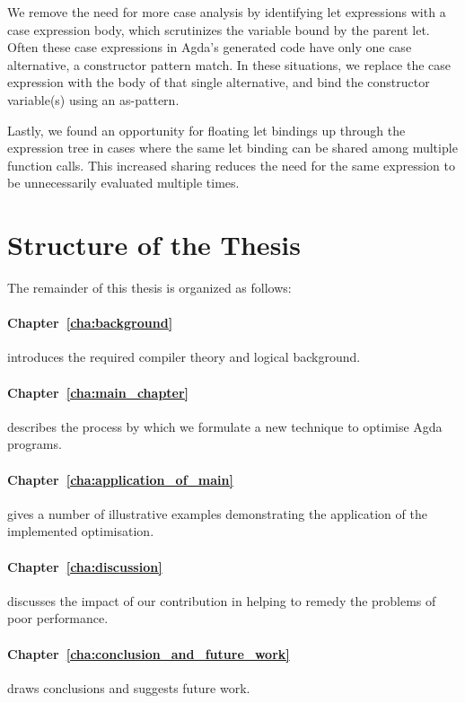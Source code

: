 We remove the need for more case analysis by identifying let expressions with a case expression body, which scrutinizes the variable bound by the parent let. Often these case expressions in Agda's generated code have only one case alternative, a constructor pattern match. In these situations, we replace the case expression with the body of that single alternative, and bind the constructor variable(s) using an as-pattern.

Lastly, we found an opportunity for floating let bindings up through the expression tree in cases where the same let binding can be shared among multiple function calls. This increased sharing reduces the need for the same expression to be unnecessarily evaluated multiple times.

\section{Structure of the Thesis}
\label{sec:structure_of_the_thesis}

The remainder of this thesis is organized as follows:

\paragraph{Chapter~\ref{cha:background}} introduces the required compiler theory and logical background.

\paragraph{Chapter~\ref{cha:main_chapter}} describes the process by which we formulate a new technique to optimise Agda programs.

\paragraph{Chapter~\ref{cha:application_of_main}} gives a number of illustrative examples demonstrating the application of the implemented optimisation.


\paragraph{Chapter~\ref{cha:discussion}} discusses the impact of our contribution in helping to remedy the problems of poor performance.

\paragraph{Chapter~\ref{cha:conclusion_and_future_work}} draws conclusions and suggests future work.
